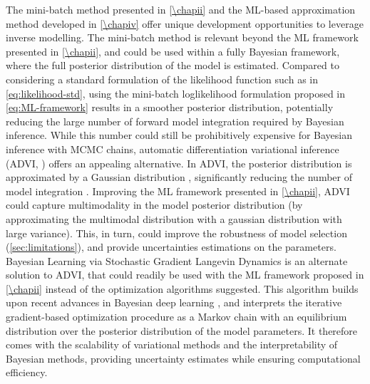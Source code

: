 The mini-batch method presented in \cref{\chapii} and the ML-based approximation method developed in \cref{\chapiv} offer unique development opportunities to leverage inverse modelling.
%
The mini-batch method is relevant beyond the ML framework presented in \cref{\chapii}, and could be used within a fully Bayesian framework, where the full posterior distribution of the model is estimated. Compared to considering a standard formulation of the likelihood function such as in \cref{eq:likelihood-std}, using the mini-batch loglikelihood formulation proposed in \cref{eq:ML-framework} results in a smoother posterior distribution, potentially reducing the large number of forward model integration required by Bayesian inference.
% 
While this number could still be prohibitively expensive for Bayesian inference with MCMC chains, automatic differentiation variational inference (ADVI, \cite{Morningstar2020,Gosh2021}) offers an appealing alternative. In ADVI, the posterior distribution is approximated by a Gaussian distribution \citep{Morningstar2020}, significantly reducing the number of model integration \citep{Morningstar2020}. Improving the ML framework presented in \cref{\chapii}, ADVI could capture multimodality in the model posterior distribution (by approximating the multimodal distribution with a gaussian distribution with large variance). This, in turn, could improve the robustness of model selection (\cref{sec:limitations}), and provide uncertainties estimations on the parameters.
% 
Bayesian Learning via Stochastic Gradient Langevin Dynamics \citep{Welling2011BayesianLV} is an alternate solution to ADVI, that could readily be used with the ML framework proposed in \cref{\chapii} instead of the optimization algorithms suggested. This algorithm builds upon recent advances in Bayesian deep learning \citep{Wilson2020}, and interprets the iterative gradient-based optimization procedure as a Markov chain with an equilibrium distribution over the posterior distribution of the model parameters. It therefore comes with the scalability of variational methods and the interpretability of Bayesian methods, providing uncertainty estimates while ensuring computational efficiency.


